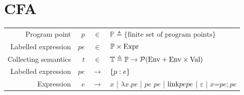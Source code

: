\documentclass{article}
\begin{document}
\section{CFA}
\begin{center}
  \begin{tabular}{rrcl}
    Program point        & $p$  & $\in$         & $\mathbb{P}\triangleq\{\text{finite set of program points}\}$                           \\
    Labelled expression  & $pe$ & $\in$         & $\mathbb{P}\times\text{Expr}$                                                                 \\
    Collecting semantics & $t$  & $\in$         & $\mathbb{T}\triangleq\mathbb{P}\rightarrow\mathcal{P}(\text{Env}+\text{Env}\times\text{Val})$                 \\
    Labelled expression  & $pe$ & $\rightarrow$ & $\{{p}:{e}\}$                                                                         \\
    Expression           & $e$  & $\rightarrow$ & $x$ | $\lambda x.pe$ | $pe$ $pe$ | $\text{link}{pe}{pe}$ | $\varepsilon$ | $x\texttt{=}pe;pe$
  \end{tabular}
\end{center}
\end{document}
